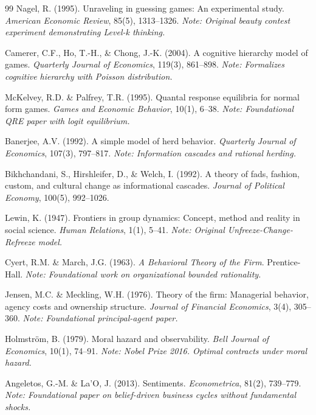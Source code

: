 \begin{thebibliography}{99}
 Nagel, R. (1995). Unraveling in guessing games: An experimental study. \textit{American Economic Review}, 85(5), 1313--1326. \textit{Note: Original beauty contest experiment demonstrating Level-k thinking.}

 Camerer, C.F., Ho, T.-H., \& Chong, J.-K. (2004). A cognitive hierarchy model of games. \textit{Quarterly Journal of Economics}, 119(3), 861--898. \textit{Note: Formalizes cognitive hierarchy with Poisson distribution.}

 McKelvey, R.D. \& Palfrey, T.R. (1995). Quantal response equilibria for normal form games. \textit{Games and Economic Behavior}, 10(1), 6--38. \textit{Note: Foundational QRE paper with logit equilibrium.}

 Banerjee, A.V. (1992). A simple model of herd behavior. \textit{Quarterly Journal of Economics}, 107(3), 797--817. \textit{Note: Information cascades and rational herding.}

 Bikhchandani, S., Hirshleifer, D., \& Welch, I. (1992). A theory of fads, fashion, custom, and cultural change as informational cascades. \textit{Journal of Political Economy}, 100(5), 992--1026.

 Lewin, K. (1947). Frontiers in group dynamics: Concept, method and reality in social science. \textit{Human Relations}, 1(1), 5--41. \textit{Note: Original Unfreeze-Change-Refreeze model.}

 Cyert, R.M. \& March, J.G. (1963). \textit{A Behavioral Theory of the Firm}. Prentice-Hall. \textit{Note: Foundational work on organizational bounded rationality.}

 Jensen, M.C. \& Meckling, W.H. (1976). Theory of the firm: Managerial behavior, agency costs and ownership structure. \textit{Journal of Financial Economics}, 3(4), 305--360. \textit{Note: Foundational principal-agent paper.}

 Holmström, B. (1979). Moral hazard and observability. \textit{Bell Journal of Economics}, 10(1), 74--91. \textit{Note: Nobel Prize 2016. Optimal contracts under moral hazard.}

 Angeletos, G.-M. \& La'O, J. (2013). Sentiments. \textit{Econometrica}, 81(2), 739--779. \textit{Note: Foundational paper on belief-driven business cycles without fundamental shocks.}


\end{thebibliography}
